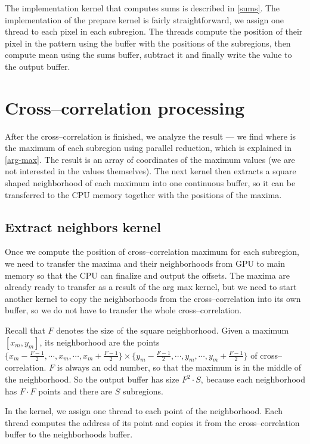 The implementation kernel that computes sums is described in \cref{sums}. The implementation of the prepare kernel is fairly straightforward, we assign one thread to each pixel in each subregion. The threads compute the position of their pixel in the pattern using the buffer with the positions of the subregions, then compute mean using the sums buffer, subtract it and finally write the value to the output buffer.


\section{Cross--correlation processing}
\label{cross-processing}
After the cross--correlation is finished, we analyze the result --- we find where is the maximum of each subregion using parallel reduction, which is explained in \cref{arg-max}. The result is an array of coordinates of the maximum values (we are not interested in the values themselves). The next kernel then extracts a square shaped neighborhood of each maximum into one continuous buffer, so it can be transferred to the CPU memory together with the positions of the maxima.

\subsection{Extract neighbors kernel}

Once we compute the position of cross--correlation maximum for each subregion, we need to transfer the maxima and their neighborhoods from GPU to main memory so that the CPU can finalize and output the offsets. The maxima are already ready to transfer as a result of the arg max kernel, but we need to start another kernel to copy the neighborhoods from the cross--correlation into its own buffer, so we do not have to transfer the whole cross--correlation.

Recall that $F$ denotes the size of the square neighborhood. Given a maximum $[x_m, y_m]$, its neighborhood are the points $\{x_m - \frac{F-1}{2}, \cdots, x_m, \cdots, x_m + \frac{F-1}{2}\} \times \{y_m - \frac{F-1}{2}, \cdots, y_m, \cdots, y_m + \frac{F-1}{2}\}$ of cross--correlation. $F$ is always an odd number, so that the maximum is in the middle of the neighborhood. So the output buffer has size $F^2 \cdot S$, because each neighborhood has $F \cdot F$ points and there are $S$ subregions.

In the kernel, we assign one thread to each point of the neighborhood. Each thread computes the address of its point and copies it from the cross--correlation buffer to the neighborhoods buffer.

